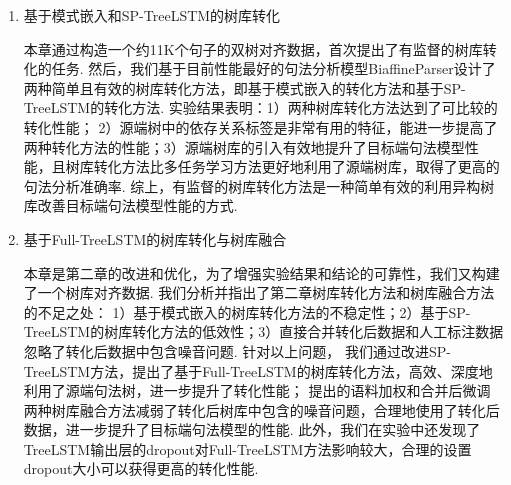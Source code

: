 \begin{enumerate}
    \item 基于模式嵌入和SP-TreeLSTM的树库转化

          本章通过构造一个约11K个句子的双树对齐数据，首次提出了有监督的树库转化的任务. 然后，我们基于目前性能最好的句法分析模型BiaffineParser设计了两种简单且有效的树库转化方法，即基于模式嵌入的转化方法和基于SP-TreeLSTM的转化方法. 实验结果表明：1）两种树库转化方法达到了可比较的转化性能； 2）源端树中的依存关系标签是非常有用的特征，能进一步提高了两种转化方法的性能；3）源端树库的引入有效地提升了目标端句法模型性能，且树库转化方法比多任务学习方法更好地利用了源端树库，取得了更高的句法分析准确率. 综上，有监督的树库转化方法是一种简单有效的利用异构树库改善目标端句法模型性能的方式.




    \item 基于Full-TreeLSTM的树库转化与树库融合

          本章是第二章的改进和优化，为了增强实验结果和结论的可靠性，我们又构建了一个树库对齐数据.
          我们分析并指出了第二章树库转化方法和树库融合方法的不足之处：
          1）基于模式嵌入的树库转化方法的不稳定性；2）基于SP-TreeLSTM的树库转化方法的低效性；3）直接合并转化后数据和人工标注数据忽略了转化后数据中包含噪音问题.
          针对以上问题，
          我们通过改进SP-TreeLSTM方法，提出了基于Full-TreeLSTM的树库转化方法，高效、深度地利用了源端句法树，进一步提升了转化性能；
          提出的语料加权和合并后微调两种树库融合方法减弱了转化后树库中包含的噪音问题，合理地使用了转化后数据，进一步提升了目标端句法模型的性能.
          此外，我们在实验中还发现了TreeLSTM输出层的dropout对Full-TreeLSTM方法影响较大，合理的设置dropout大小可以获得更高的转化性能.


\end{enumerate}
